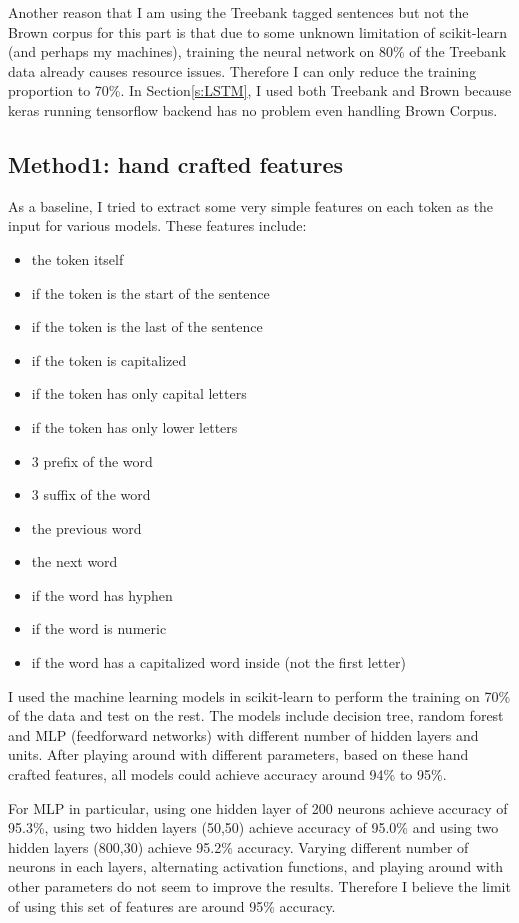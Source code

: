 \documentclass[11pt]{article}
\theoremstyle{plain}
\begin{document}
Another reason that I am using the Treebank tagged sentences but not the 
Brown corpus for this part is that due to some unknown limitation of 
scikit-learn (and perhaps my machines), training the neural network on 80\% 
of the Treebank data already causes resource issues. Therefore I can only 
reduce the training proportion to 70\%. In Section\ref{s:LSTM}, I used both 
Treebank and Brown because keras running tensorflow backend has no 
problem even handling Brown Corpus. 

\subsection{Method1: hand crafted features}
As a baseline, I tried to extract some very simple features on each token as 
the input for various models. These features include:
\begin{itemize}
	\item the token itself
	\item if the token is the start of the sentence
	\item if the token is the last of the sentence
	\item if the token is capitalized
	\item if the token has only capital letters
	\item if the token has only lower letters
	\item 3 prefix of the word
	\item 3 suffix of the word
	\item the previous word
	\item the next word
	\item if the word has hyphen
	\item if the word is numeric
	\item if the word has a capitalized word inside (not the first letter)
\end{itemize}

I used the machine learning models in scikit-learn to perform the training on 
70\% of the data and test on the rest. The models include decision tree, 
random forest and MLP (feedforward networks) with different number of 
hidden layers and units. After playing around with different parameters, 
based on these hand crafted features, all models could achieve accuracy 
around 94\% to 95\%. 

For MLP in particular, using one hidden layer of 200 neurons achieve 
accuracy of 95.3\%, using two hidden layers (50,50) achieve accuracy of 
95.0\% and using two hidden layers (800,30) achieve 95.2\% accuracy. 
Varying different number of neurons in each layers, alternating activation 
functions, and playing around with other parameters do not seem to improve 
the results. Therefore I believe the limit of using this set of features are 
around 95\% accuracy. 
\end{document}
